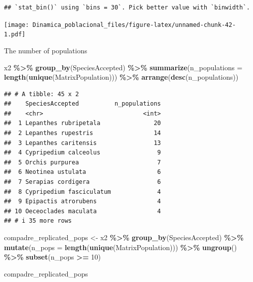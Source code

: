 \documentclass[
]{book}
\newenvironment{Shaded}{\begin{snugshade}}{\end{snugshade}}
\newcommand{\AttributeTok}[1]{\textcolor[rgb]{0.13,0.29,0.53}{#1}}
\newcommand{\DecValTok}[1]{\textcolor[rgb]{0.00,0.00,0.81}{#1}}
\newcommand{\FunctionTok}[1]{\textcolor[rgb]{0.13,0.29,0.53}{\textbf{#1}}}
\newcommand{\NormalTok}[1]{#1}
\newcommand{\OtherTok}[1]{\textcolor[rgb]{0.56,0.35,0.01}{#1}}
\newcommand{\SpecialCharTok}[1]{\textcolor[rgb]{0.81,0.36,0.00}{\textbf{#1}}}
\theoremstyle{definition}
\theoremstyle{definition}
\theoremstyle{definition}
\theoremstyle{definition}
\theoremstyle{remark}
\begin{document}
\begin{verbatim}
## `stat_bin()` using `bins = 30`. Pick better value with `binwidth`.
\end{verbatim}

\texttt{[image: Dinamica\_poblacional\_files/figure-latex/unnamed-chunk-42-1.pdf]}

The number of populations

\begin{Shaded}
\begin{Highlighting}[]
\NormalTok{x2 }\SpecialCharTok{\%\textgreater{}\%} 
  \FunctionTok{group\_by}\NormalTok{(SpeciesAccepted) }\SpecialCharTok{\%\textgreater{}\%} 
  \FunctionTok{summarize}\NormalTok{(}\AttributeTok{n\_populations =} \FunctionTok{length}\NormalTok{(}\FunctionTok{unique}\NormalTok{(MatrixPopulation))) }\SpecialCharTok{\%\textgreater{}\%} 
  \FunctionTok{arrange}\NormalTok{(}\FunctionTok{desc}\NormalTok{(n\_populations))}
\end{Highlighting}
\end{Shaded}

\begin{verbatim}
## # A tibble: 45 x 2
##    SpeciesAccepted          n_populations
##    <chr>                            <int>
##  1 Lepanthes rubripetala               20
##  2 Lepanthes rupestris                 14
##  3 Lepanthes caritensis                13
##  4 Cypripedium calceolus                9
##  5 Orchis purpurea                      7
##  6 Neotinea ustulata                    6
##  7 Serapias cordigera                   6
##  8 Cypripedium fasciculatum             4
##  9 Epipactis atrorubens                 4
## 10 Oeceoclades maculata                 4
## # i 35 more rows
\end{verbatim}

\begin{Shaded}
\begin{Highlighting}[]
\NormalTok{compadre\_replicated\_pops }\OtherTok{\textless{}{-}}\NormalTok{ x2 }\SpecialCharTok{\%\textgreater{}\%} 
  \FunctionTok{group\_by}\NormalTok{(SpeciesAccepted) }\SpecialCharTok{\%\textgreater{}\%} 
  \FunctionTok{mutate}\NormalTok{(}\AttributeTok{n\_pops =} \FunctionTok{length}\NormalTok{(}\FunctionTok{unique}\NormalTok{(MatrixPopulation))) }\SpecialCharTok{\%\textgreater{}\%} 
  \FunctionTok{ungroup}\NormalTok{() }\SpecialCharTok{\%\textgreater{}\%}
  \FunctionTok{subset}\NormalTok{(n\_pops }\SpecialCharTok{\textgreater{}=} \DecValTok{10}\NormalTok{)}

\NormalTok{compadre\_replicated\_pops}
\end{Highlighting}
\end{Shaded}
\end{document}
